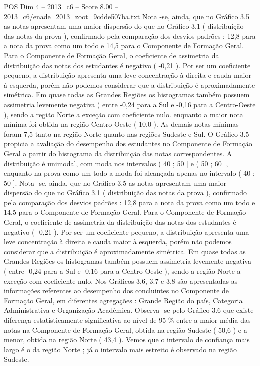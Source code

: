 \begin{textsample}{POS Dim 4 – 2013\_c6 – Score 8.00 – 2013\_c6/enade\_2013\_zoot\_9cdde507ba.txt}
Nota -se, ainda, que no Gráfico 3.5 as notas apresentam uma maior dispersão do que no Gráfico 3.1 ( distribuição das notas da prova ), confirmado pela comparação dos desvios padrões : 12,8 para a nota da prova como um todo e 14,5 para o Componente de Formação Geral.
Para o Componente de Formação Geral, o coeficiente de assimetria da distribuição das notas dos estudantes é negativo ( -0,21 ).
Por ser um coeficiente pequeno, a distribuição apresenta uma leve concentração à direita e cauda maior à esquerda, porém não podemos considerar que a distribuição é aproximadamente simétrica.
Em quase todas as Grandes Regiões os histogramas também possuem assimetria levemente negativa ( entre -0,24 para a Sul e -0,16 para a Centro-Oeste ), sendo a região Norte a exceção com coeficiente nulo. enquanto a maior nota mínima foi obtida na região Centro-Oeste ( 10,0 ).
As demais notas mínimas foram 7,5 tanto na região Norte quanto nas regiões Sudeste e Sul.
O Gráfico 3.5 propicia a avaliação do desempenho dos estudantes no Componente de Formação Geral a partir do histograma da distribuição das notas correspondentes.
A distribuição é unimodal, com moda nos intervalos ( 40 ; 50 ] e ( 50 ; 60 ], enquanto na prova como um todo a moda foi alcançada apenas no intervalo ( 40 ; 50 ].
Nota -se, ainda, que no Gráfico 3.5 as notas apresentam uma maior dispersão do que no Gráfico 3.1 ( distribuição das notas da prova ), confirmado pela comparação dos desvios padrões : 12,8 para a nota da prova como um todo e 14,5 para o Componente de Formação Geral.
Para o Componente de Formação Geral, o coeficiente de assimetria da distribuição das notas dos estudantes é negativo ( -0,21 ).
Por ser um coeficiente pequeno, a distribuição apresenta uma leve concentração à direita e cauda maior à esquerda, porém não podemos considerar que a distribuição é aproximadamente simétrica.
Em quase todas as Grandes Regiões os histogramas também possuem assimetria levemente negativa ( entre -0,24 para a Sul e -0,16 para a Centro-Oeste ), sendo a região Norte a exceção com coeficiente nulo.
Nos Gráficos 3.6, 3.7 e 3.8 são apresentadas as informações referentes ao desempenho dos concluintes no Componente de Formação Geral, em diferentes agregações : Grande Região do país, Categoria Administrativa e Organização Acadêmica.
Observa -se pelo Gráfico 3.6 que existe diferença estatisticamente significativa ao nível de 95 \% entre a maior média das notas na Componente de Formação Geral, obtida na região Sudeste ( 50,6 ) e a menor, obtida na região Norte ( 43,4 ).
Vemos que o intervalo de confiança mais largo é o da região Norte ; já o intervalo mais estreito é observado na região Sudeste.

\end{textsample}
